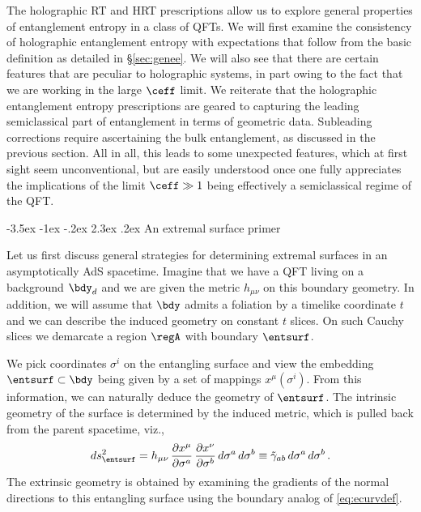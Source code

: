 \documentclass[12pt,openany]{book}
\makeatletter
\renewcommand\section{\@startsection {section}{1}{\z@}%
                                   {-3.5ex \@plus -1ex \@minus -.2ex}%
                                   {2.3ex \@plus.2ex}%
                                   {\normalfont\large\bfseries}}
\makeatother
\begin{document}
The holographic RT and HRT prescriptions allow us to explore general properties of entanglement entropy in a class of QFTs. We will first examine the consistency of holographic entanglement entropy with expectations that follow from the basic definition as detailed in \S\ref{sec:genee}. We will also see that there are certain features that are peculiar to holographic systems, in part owing to the fact that we are working in the large $\ceff$ limit. We reiterate that the holographic entanglement entropy prescriptions are geared to capturing the leading semiclassical part of entanglement in terms of geometric data. Subleading corrections require ascertaining the bulk entanglement, as discussed in the previous section. All in all,  this leads to some unexpected features, which at first sight seem unconventional, but are easily understood once one fully appreciates the implications of the limit $\ceff\gg 1$ being effectively a semiclassical regime of the QFT.

\section{An extremal surface primer}
\label{sec:extdeter}

Let us first discuss general strategies for determining extremal surfaces in an asymptotically AdS spacetime. Imagine that we have a QFT living on a background $\bdy_d$ and we are given the metric $h_{\mu\nu}$ on this boundary geometry. In addition, we will assume that
$\bdy$ admits a foliation by a timelike coordinate $t$ and we can describe the induced geometry on constant $t$ slices. On such Cauchy slices we demarcate a region $\regA$ with boundary $\entsurf$.


We pick coordinates  $\sigma^i$ on the entangling surface and view the embedding $\entsurf \subset \bdy$ being given by a set of mappings $x^\mu(\sigma^i)$. From this information, we can naturally deduce the geometry of $\entsurf$. The intrinsic geometry of the surface is determined by the induced metric, which is pulled back from the parent spacetime, viz.,
%
\begin{equation}
ds^2_{\entsurf} = h_{\mu\nu}\, \frac{\partial x^\mu}{\partial \sigma^a}\, \frac{\partial x^\nu}{\partial \sigma^b}\, d\sigma^a\, d\sigma^b
\equiv \tilde{\gamma}_{ab}  \,d\sigma^a\, d\sigma^b \,.
 \label{}
\end{equation}
%
The extrinsic geometry is obtained by examining the gradients of the normal directions to this entangling surface using the boundary analog of \eqref{eq:ecurvdef}.
\end{document}
